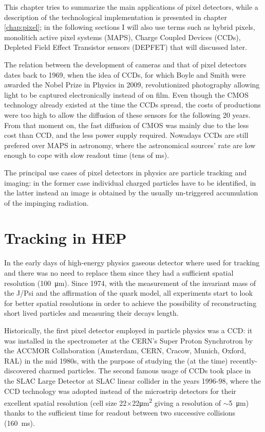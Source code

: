 This chapter tries to summarize the main applications of pixel detectors, while a description of the technological implementation is presented in chapter \ref{chap:pixel}; in the following sections I will also use terms such as hybrid pixels, monolitich active pixel systems (MAPS), Charge Coupled Devices (CCDs), Depleted Field Effect Transistor sensors (DEPFET) that will discussed later. 

The relation between the development of cameras and that of pixel detectors dates back to 1969, when the idea of CCDs, for which Boyle and Smith were awarded the Nobel Prize in Physics in 2009, revolutionized photography allowing light to be captured electronically instead of on film. 
Even though the CMOS technology already existed at the time the CCDs spread, the costs of productions were too high to allow the diffusion of these sensors for the following 20 years. From that moment on, the fast diffusion of CMOS was mainly due to the less cost than CCD, and the less power supply required. Nowadays CCDs are still prefered over MAPS in astronomy, where the astronomical sources' rate are low enough to cope with slow readout time (tens of \si{ms}).  

The principal use cases of pixel detectors in physics are particle tracking and imaging: in the former case individual charged particles have to be identified, in the latter instead an image is obtained by the usually un-triggered accumulation of the impinging radiation. 

\section{Tracking in HEP}
    In the early days of high-energy physics gaseous detector where used for tracking and there was no need to replace them since they had a sufficient spatial resolution (\SI{100}{\um}). Since 1974, with the measurement of the invariant mass of the J/Psi and the affirmation of the quark model, all experiments start to look for better spatial resolutions in order to achieve the possibility of reconstructing short lived particles and measuring their decays length.  

    Historically\cite{cern_courier_2021}, the first pixel detector employed in particle physics was a CCD: it was installed in the spectrometer at the CERN’s Super Proton Synchrotron by the ACCMOR Collaboration (Amsterdam, CERN, Cracow, Munich, Oxford, RAL) in the mid 1980s, with the purpose of studying the (at the time) recently-discovered charmed particles.
    The second famous usage of CCDs took place in the SLAC Large Detector at SLAC linear collider in the years 1996-98, where the CCD technology was adopted instead of the microstrip detectors for their excellent spatial resolution (cell size 22$\times$22\si{\um\squared} giving a resolution of $\sim$\SI{5}{\um}) thanks to the sufficient time for readout between two successive collisions (\SI{160}{ms}).

